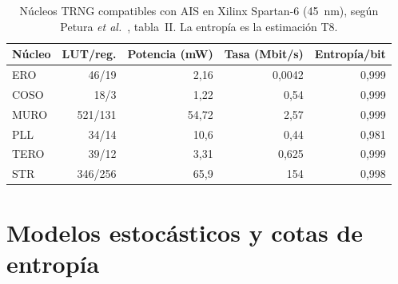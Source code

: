 \begin{table}[htbp]
\centering
\caption{Núcleos TRNG compatibles con AIS en Xilinx Spartan-6 (45~nm),
según Petura \emph{et al.}~\cite{petura_2016_survey}, tabla~II. La
entropía es la estimación T8.}
\label{tab:petura}
\begin{tabular}{@{}lrrrr@{}}
\toprule
Núcleo & LUT/reg. & Potencia (mW) & Tasa (Mbit/s) & Entropía/bit \\
\midrule
ERO  & 46/19   & 2,16  & 0,0042 & 0,999 \\
COSO & 18/3    & 1,22  & 0,54   & 0,999 \\
MURO & 521/131 & 54,72 & 2,57   & 0,999 \\
PLL  & 34/14   & 10,6  & 0,44   & 0,981 \\
TERO & 39/12   & 3,31  & 0,625  & 0,999 \\
STR  & 346/256 & 65,9  & 154    & 0,998 \\
\bottomrule
\end{tabular}
\end{table}

\section{Modelos estocásticos y cotas de entropía}
\label{sec:soa_models}

